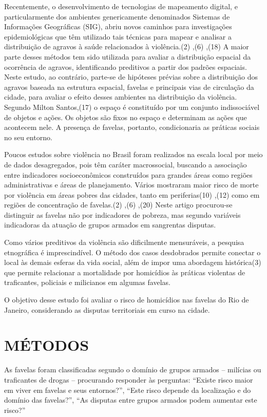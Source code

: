 \documentclass{article}
\begin{document}
Recentemente, o desenvolvimento de tecnologias de mapeamento digital, e
particularmente dos ambientes genericamente denominados Sistemas de Informações
Geográficas (SIG), abriu novos caminhos para investigações epidemiológicas que
têm utilizado tais técnicas para mapear e analisar a distribuição de agravos à
saúde relacionados à violência.(2)
,(6)
,(18)
A maior parte desses métodos tem sido utilizada para avaliar a distribuição
espacial da ocorrência de agravos, identificando preditivos a partir dos padrões
espaciais. Neste estudo, ao contrário, parte-se de hipóteses prévias sobre a
distribuição dos agravos baseada na estrutura espacial, favelas e principais
vias de circulação da cidade, para avaliar o efeito desses ambientes na
distribuição da violência. Segundo Milton Santos,(17)
o espaço é constituído por um conjunto indissociável de objetos e ações. Os
objetos são fixos no espaço e determinam as ações que acontecem nele. A presença
de favelas, portanto, condicionaria as práticas sociais no seu entorno.

Poucos estudos sobre violência no Brasil foram realizados na escala local por
meio de dados desagregados, pois têm caráter macrossocial, buscando a associação
entre indicadores socioeconômicos construídos para grandes áreas como regiões
administrativas e áreas de planejamento. Vários mostraram maior risco de morte
por violência em áreas pobres das cidades, tanto em periferias(10)
,(12)
como em regiões de concentração de favelas.(2)
,(6)
,(20)
Neste artigo procurou-se distinguir as favelas não por indicadores de pobreza,
mas segundo variáveis indicadoras da atuação de grupos armados em sangrentas
disputas.

Como vários preditivos da violência são dificilmente mensuráveis, a pesquisa
etnográfica é imprescindível. O método dos casos desdobrados permite conectar o
local às demais esferas da vida social, além de impor uma abordagem histórica(3)
que permite relacionar a mortalidade por homicídios às práticas violentas de
traficantes, policiais e milicianos em algumas favelas.

O objetivo desse estudo foi avaliar o risco de homicídios nas favelas do Rio de
Janeiro, considerando as disputas territoriais em curso na cidade.

\section{MÉTODOS}

As favelas foram classificadas segundo o domínio de grupos armados – milícias ou
traficantes de drogas – procurando responder às perguntas: “Existe risco maior
em viver em favelas e seus entornos?”, “Este risco depende da localização e do
domínio das favelas?”, “As disputas entre grupos armados podem aumentar este
risco?”
\end{document}
